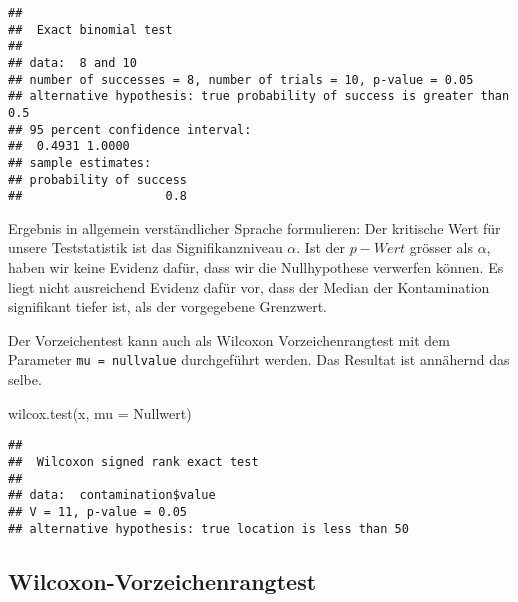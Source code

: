 \documentclass[
]{book}
\newenvironment{Shaded}{\begin{snugshade}}{\end{snugshade}}
\newcommand{\AttributeTok}[1]{\textcolor[rgb]{0.77,0.63,0.00}{#1}}
\newcommand{\CommentTok}[1]{\textcolor[rgb]{0.56,0.35,0.01}{\textit{#1}}}
\newcommand{\FunctionTok}[1]{\textcolor[rgb]{0.00,0.00,0.00}{#1}}
\newcommand{\NormalTok}[1]{#1}
\newcommand{\SpecialCharTok}[1]{\textcolor[rgb]{0.00,0.00,0.00}{#1}}
\newcommand{\StringTok}[1]{\textcolor[rgb]{0.31,0.60,0.02}{#1}}
\begin{document}
\begin{verbatim}
## 
##  Exact binomial test
## 
## data:  8 and 10
## number of successes = 8, number of trials = 10, p-value = 0.05
## alternative hypothesis: true probability of success is greater than 0.5
## 95 percent confidence interval:
##  0.4931 1.0000
## sample estimates:
## probability of success 
##                    0.8
\end{verbatim}

Ergebnis in allgemein verständlicher Sprache formulieren: Der kritische Wert für unsere Teststatistik ist das Signifikanzniveau \(\alpha\). Ist der \(p-Wert\) grösser als \(\alpha\), haben wir keine Evidenz dafür, dass wir die Nullhypothese verwerfen können. Es liegt nicht ausreichend Evidenz dafür vor, dass der Median der Kontamination signifikant tiefer ist, als der vorgegebene Grenzwert.

Der Vorzeichentest kann auch als Wilcoxon Vorzeichenrangtest mit dem Parameter \texttt{mu\ =\ nullvalue} durchgeführt werden. Das Resultat ist annähernd das selbe.

\begin{Shaded}
\begin{Highlighting}[]
\FunctionTok{wilcox.test}\NormalTok{(x, }\AttributeTok{mu =}\NormalTok{ Nullwert)}
\end{Highlighting}
\end{Shaded}

\begin{Shaded}
\end{Shaded}

\begin{verbatim}
## 
##  Wilcoxon signed rank exact test
## 
## data:  contamination$value
## V = 11, p-value = 0.05
## alternative hypothesis: true location is less than 50
\end{verbatim}

\hypertarget{wilcoxon-vorzeichenrangtest}{%
\subsection{Wilcoxon-Vorzeichenrangtest}\label{wilcoxon-vorzeichenrangtest}}
\end{document}
